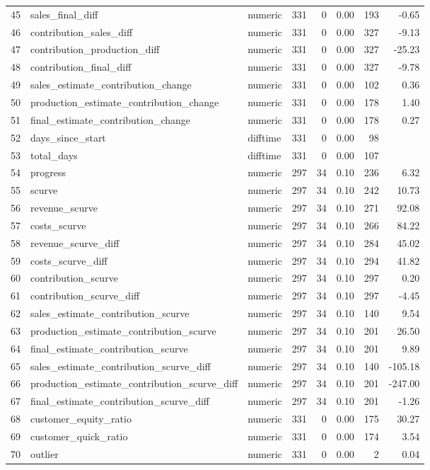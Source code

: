 \begin{sidewaystable}[ht]
\begin{tabular}{rllrrrrr}
  45 & sales\_final\_diff & numeric & 331 &   0 & 0.00 & 193 & -0.65 \\ 
  46 & contribution\_sales\_diff & numeric & 331 &   0 & 0.00 & 327 & -9.13 \\ 
  47 & contribution\_production\_diff & numeric & 331 &   0 & 0.00 & 327 & -25.23 \\ 
  48 & contribution\_final\_diff & numeric & 331 &   0 & 0.00 & 327 & -9.78 \\ 
  49 & sales\_estimate\_contribution\_change & numeric & 331 &   0 & 0.00 & 102 & 0.36 \\ 
  50 & production\_estimate\_contribution\_change & numeric & 331 &   0 & 0.00 & 178 & 1.40 \\ 
  51 & final\_estimate\_contribution\_change & numeric & 331 &   0 & 0.00 & 178 & 0.27 \\ 
  52 & days\_since\_start & difftime & 331 &   0 & 0.00 &  98 &  \\ 
  53 & total\_days & difftime & 331 &   0 & 0.00 & 107 &  \\ 
  54 & progress & numeric & 297 &  34 & 0.10 & 236 & 6.32 \\ 
  55 & scurve & numeric & 297 &  34 & 0.10 & 242 & 10.73 \\ 
  56 & revenue\_scurve & numeric & 297 &  34 & 0.10 & 271 & 92.08 \\ 
  57 & costs\_scurve & numeric & 297 &  34 & 0.10 & 266 & 84.22 \\ 
  58 & revenue\_scurve\_diff & numeric & 297 &  34 & 0.10 & 284 & 45.02 \\ 
  59 & costs\_scurve\_diff & numeric & 297 &  34 & 0.10 & 294 & 41.82 \\ 
  60 & contribution\_scurve & numeric & 297 &  34 & 0.10 & 297 & 0.20 \\ 
  61 & contribution\_scurve\_diff & numeric & 297 &  34 & 0.10 & 297 & -4.45 \\ 
  62 & sales\_estimate\_contribution\_scurve & numeric & 297 &  34 & 0.10 & 140 & 9.54 \\ 
  63 & production\_estimate\_contribution\_scurve & numeric & 297 &  34 & 0.10 & 201 & 26.50 \\ 
  64 & final\_estimate\_contribution\_scurve & numeric & 297 &  34 & 0.10 & 201 & 9.89 \\ 
  65 & sales\_estimate\_contribution\_scurve\_diff & numeric & 297 &  34 & 0.10 & 140 & -105.18 \\ 
  66 & production\_estimate\_contribution\_scurve\_diff & numeric & 297 &  34 & 0.10 & 201 & -247.00 \\ 
  67 & final\_estimate\_contribution\_scurve\_diff & numeric & 297 &  34 & 0.10 & 201 & -1.26 \\ 
  68 & customer\_equity\_ratio & numeric & 331 &   0 & 0.00 & 175 & 30.27 \\ 
  69 & customer\_quick\_ratio & numeric & 331 &   0 & 0.00 & 174 & 3.54 \\ 
  70 & outlier & numeric & 331 &   0 & 0.00 &   2 & 0.04 \\ 
   \hline
\end{tabular}
\end{sidewaystable}

